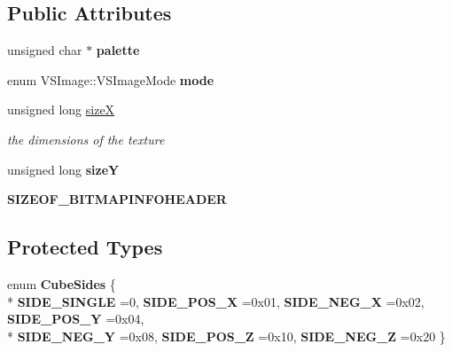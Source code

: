 \subsection*{Public Attributes}
\begin{DoxyCompactItemize}
\item 
unsigned char $\ast$ {\bfseries palette}\hypertarget{classVSImage_a90c4c95f7913f86f767097428c91245f}{}\label{classVSImage_a90c4c95f7913f86f767097428c91245f}

\item 
enum V\+S\+Image\+::\+V\+S\+Image\+Mode {\bfseries mode}\hypertarget{classVSImage_a1e02b2ee1e91c19f5cc1db4b6cee95fc}{}\label{classVSImage_a1e02b2ee1e91c19f5cc1db4b6cee95fc}

\item 
unsigned long \hyperlink{classVSImage_ae5292347761f1391eba77939470421c1}{sizeX}\hypertarget{classVSImage_ae5292347761f1391eba77939470421c1}{}\label{classVSImage_ae5292347761f1391eba77939470421c1}

\begin{DoxyCompactList}\small\item\em the dimensions of the texture \end{DoxyCompactList}\item 
unsigned long {\bfseries sizeY}\hypertarget{classVSImage_ae5d55b627592a7ca9ecd0aa07a5afb47}{}\label{classVSImage_ae5d55b627592a7ca9ecd0aa07a5afb47}

\item 
{\bfseries S\+I\+Z\+E\+O\+F\+\_\+\+B\+I\+T\+M\+A\+P\+I\+N\+F\+O\+H\+E\+A\+D\+ER}\hypertarget{classVSImage_a6a433ae489a2ab832143b97174fae3f3}{}\label{classVSImage_a6a433ae489a2ab832143b97174fae3f3}

\end{DoxyCompactItemize}
\subsection*{Protected Types}
\begin{DoxyCompactItemize}
\item 
enum {\bfseries Cube\+Sides} \{ \\*
{\bfseries S\+I\+D\+E\+\_\+\+S\+I\+N\+G\+LE} =0, 
{\bfseries S\+I\+D\+E\+\_\+\+P\+O\+S\+\_\+X} =0x01, 
{\bfseries S\+I\+D\+E\+\_\+\+N\+E\+G\+\_\+X} =0x02, 
{\bfseries S\+I\+D\+E\+\_\+\+P\+O\+S\+\_\+Y} =0x04, 
\\*
{\bfseries S\+I\+D\+E\+\_\+\+N\+E\+G\+\_\+Y} =0x08, 
{\bfseries S\+I\+D\+E\+\_\+\+P\+O\+S\+\_\+Z} =0x10, 
{\bfseries S\+I\+D\+E\+\_\+\+N\+E\+G\+\_\+Z} =0x20
 \}\hypertarget{classVSImage_a4d037ae4235532c35dcaa17ebefe5df1}{}\label{classVSImage_a4d037ae4235532c35dcaa17ebefe5df1}

\end{DoxyCompactItemize}
